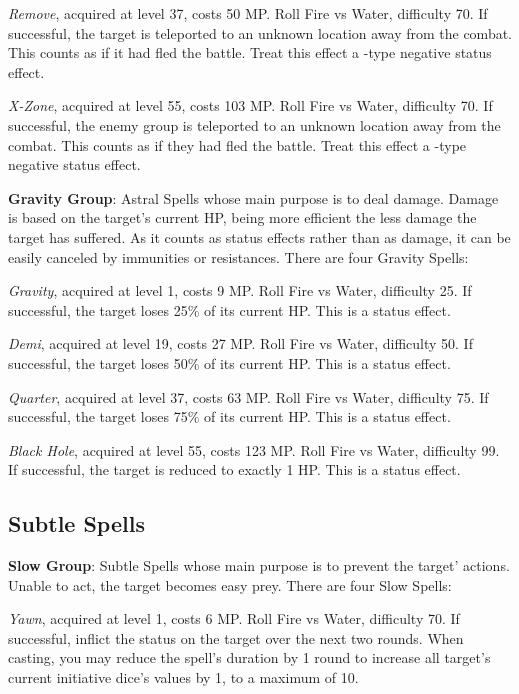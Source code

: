 \begin{multicols}{2}
    \textit{Remove}, acquired at level 37, costs 50 MP. Roll Fire vs Water, difficulty 70. If successful, the target is teleported to an unknown location away from the combat. This counts as if it had fled the battle. Treat this effect a -type negative status effect.
    
    \textit{X-Zone}, acquired at level 55, costs 103 MP. Roll Fire vs Water, difficulty 70. If successful, the enemy group is teleported to an unknown location away from the combat. This counts as if they had fled the battle. Treat this effect a -type negative status effect.
    
    \textbf{Gravity Group}: Astral Spells whose main purpose is to deal damage. Damage is based on the target’s current HP, being more efficient the less damage the target has suffered. As it counts as status effects rather than as damage, it can be easily canceled by immunities or resistances. There are four Gravity Spells:
    
    \textit{Gravity}, acquired at level 1, costs 9 MP. Roll Fire vs Water, difficulty 25. If successful, the target loses 25\% of its current HP. This is a  status effect.
    
    \textit{Demi}, acquired at level 19, costs 27 MP. Roll Fire vs Water, difficulty 50. If successful, the target loses 50\% of its current HP. This is a  status effect.
    
    \textit{Quarter}, acquired at level 37, costs 63 MP. Roll Fire vs Water, difficulty 75. If successful, the target loses 75\% of its current HP. This is a  status effect.
    
    \textit{Black Hole}, acquired at level 55, costs 123 MP. Roll Fire vs Water, difficulty 99. If successful, the target is reduced to exactly 1 HP. This is a  status effect.
    
    \subsection{Subtle Spells}

    \textbf{Slow Group}: Subtle Spells whose main purpose is to prevent the target’ actions. Unable to act, the target becomes easy prey. There are four Slow Spells:
    
    \textit{Yawn}, acquired at level 1, costs 6 MP. Roll Fire vs Water, difficulty 70. If successful, inflict the  status on the target over the next two rounds. When casting, you may reduce the spell's duration by 1 round to increase all target's current initiative dice's values by 1, to a maximum of 10.
    

\end{multicols}
